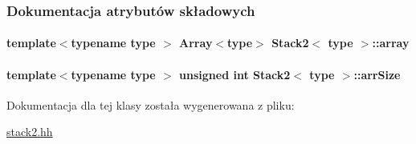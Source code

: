 \subsubsection{Dokumentacja atrybutów składowych}
\hypertarget{class_stack2_a2abbc6c6b7ba098a51bc01b2916fec39}{
\paragraph[{array}]{\setlength{\rightskip}{0pt plus 5cm}template$<$typename type $>$ {\bf Array}$<$type$>$ {\bf Stack2}$<$ type $>$\-::array\hspace{0.3cm}{\ttfamily [private]}}}\label{class_stack2_a2abbc6c6b7ba098a51bc01b2916fec39}
\hypertarget{class_stack2_a0099a83ca9cc7678deeb04f6d2706412}{
\paragraph[{arr\-Size}]{\setlength{\rightskip}{0pt plus 5cm}template$<$typename type $>$ unsigned int {\bf Stack2}$<$ type $>$\-::arr\-Size\hspace{0.3cm}{\ttfamily [private]}}}\label{class_stack2_a0099a83ca9cc7678deeb04f6d2706412}


Dokumentacja dla tej klasy została wygenerowana z pliku\-:\begin{DoxyCompactItemize}
\item 
\hyperlink{stack2_8hh}{stack2.\-hh}\end{DoxyCompactItemize}
